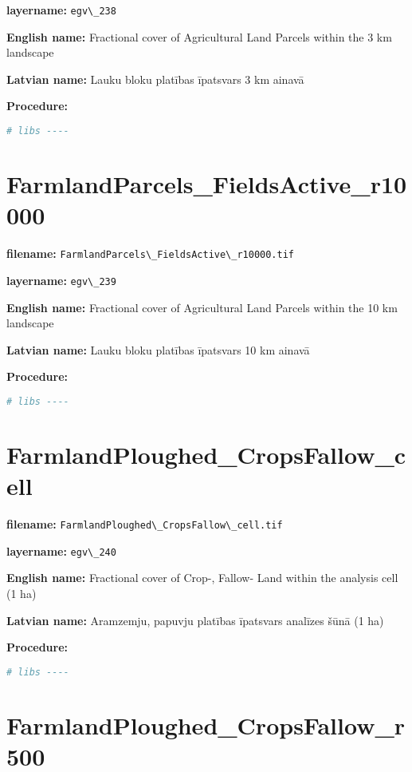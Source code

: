 \documentclass[
]{book}
\newcommand{\passthrough}[1]{#1}
\begin{document}
\textbf{layername:} \passthrough{\lstinline!egv\_238!}

\textbf{English name:} Fractional cover of Agricultural Land Parcels within the 3 km landscape

\textbf{Latvian name:} Lauku bloku platības īpatsvars 3 km ainavā

\textbf{Procedure:}

\begin{lstlisting}[language=R]
# libs ----
\end{lstlisting}

\section{FarmlandParcels\_FieldsActive\_r10000}\label{ch06.239}

\textbf{filename:} \passthrough{\lstinline!FarmlandParcels\_FieldsActive\_r10000.tif!}

\textbf{layername:} \passthrough{\lstinline!egv\_239!}

\textbf{English name:} Fractional cover of Agricultural Land Parcels within the 10 km landscape

\textbf{Latvian name:} Lauku bloku platības īpatsvars 10 km ainavā

\textbf{Procedure:}

\begin{lstlisting}[language=R]
# libs ----
\end{lstlisting}

\section{FarmlandPloughed\_CropsFallow\_cell}\label{ch06.240}

\textbf{filename:} \passthrough{\lstinline!FarmlandPloughed\_CropsFallow\_cell.tif!}

\textbf{layername:} \passthrough{\lstinline!egv\_240!}

\textbf{English name:} Fractional cover of Crop-, Fallow- Land within the analysis cell (1 ha)

\textbf{Latvian name:} Aramzemju, papuvju platības īpatsvars analīzes šūnā (1 ha)

\textbf{Procedure:}

\begin{lstlisting}[language=R]
# libs ----
\end{lstlisting}

\section{FarmlandPloughed\_CropsFallow\_r500}\label{ch06.241}
\end{document}
